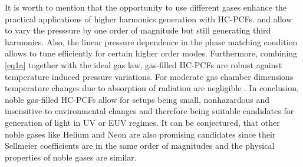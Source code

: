 \documentclass[fleqn, 10pt, twocolumn]{SelfArx}
\begin{document}
    It is worth to mention that the opportunity to use different gases enhance the practical applications of higher harmonics generation with HC-PCFs. 
     and  allow to vary the presssure by one order of magnitude but still generating third harmonics. Also, the linear pressure dependence in the phase matching condition
    allows to tune efficiently for certain higher order modes.
    Furthermore, combining \eqref{eq1a} together with the ideal gas law, gas-filled HC-PCFs are robust against temperature induced pressure variations. For moderate gas chamber dimensions temperature changes due to absorption of radiation are negligible \cite{Serebryannikov2004}.
    In conclusion, noble gas-filled HC-PCFs allow for setups being small, nonhazardous and insensitive to environmental changes and therefore being 
    suitable candidates for generation of light in UV or EUV regimes.
    It can be conjectured, that other noble gases like Helium and Neon are also promising candidates since their Sellmeier coefficients are in the same order of magnitudes and the physical properties of noble gases are similar. 

    \printbibliography
\end{document}
